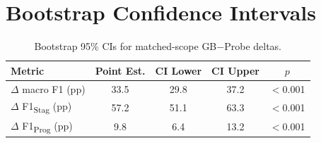 \documentclass[11pt,a4paper]{article}
\begin{document}
\section{Bootstrap Confidence Intervals}
\label{app:bootstrap}

\begin{table}[h]
\centering
\small
\begin{tabular}{lcccc}
\toprule
\textbf{Metric} & \textbf{Point Est.} & \textbf{CI Lower} & \textbf{CI Upper} & \textbf{$p$} \\
\midrule
$\Delta$ macro F1 (pp) & 33.5 & 29.8 & 37.2 & $<$0.001 \\
$\Delta$ F1\textsubscript{Stag} (pp) & 57.2 & 51.1 & 63.3 & $<$0.001 \\
$\Delta$ F1\textsubscript{Prog} (pp) & 9.8 & 6.4 & 13.2 & $<$0.001 \\
\bottomrule
\end{tabular}
\caption{Bootstrap 95\% CIs for matched-scope GB$-$Probe deltas.}
\label{tab:bootstrap}
\end{table}
\end{document}
